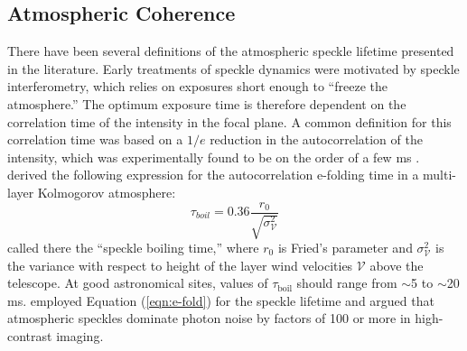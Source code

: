 \documentclass[10pt,preprint]{aastex631}
\begin{document}
\subsection{Atmospheric Coherence}
There have been several definitions of the atmospheric speckle lifetime presented in the literature.  Early treatments of speckle dynamics were motivated by speckle interferometry, which relies on exposures short enough to ``freeze the atmosphere.''  The optimum exposure time is therefore dependent on the correlation time of the intensity in the focal plane.  A common definition for this correlation time was based on a $1/e$ reduction in the autocorrelation of the intensity, which was experimentally found to be on the order of a few ms \citep{1978ApOpt..17.3779S,1990JMOp...37.1247D}.    \citet{1982JOpt...13..263R} derived the following expression for the autocorrelation e-folding time in a multi-layer Kolmogorov atmosphere:
\begin{equation}
\tau_{boil} = 0.36 \frac{r_0}{\sqrt{\sigma^2_\mathcal{V}}}
\label{eqn:e-fold}
\end{equation}
called there the ``speckle boiling time,'' where $r_0$ is Fried's parameter and $\sigma^2_\mathcal{V}$ is the variance with respect to height of the layer wind velocities $\mathcal{V}$  above the telescope.  At good astronomical sites, values of $\tau_\text{boil}$ should range from $\sim$5 to $\sim$20 ms. \citet{1999PASP..111..587R} employed Equation (\ref{eqn:e-fold}) for the speckle lifetime and argued that atmospheric speckles dominate photon noise by factors of 100 or more in high-contrast imaging.
\end{document}

